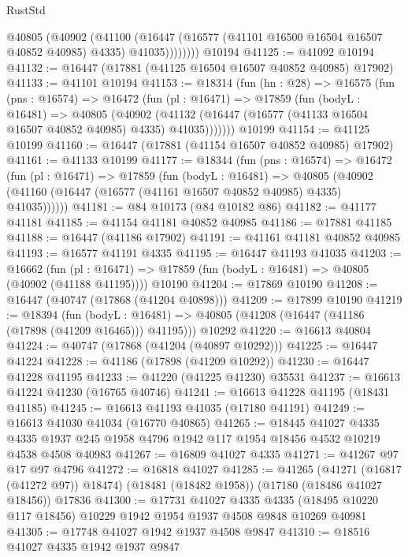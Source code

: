 \begin{lexlean}{RustStd}
\begin{coremodule}
            @40805
              (@40902
                (@41100
                  (@16447 (@16577 (@41101 @16500 @16504 @16507 @40852 @40985) @4335) @41035))))))))
    @10194
@41125 := @41092 @10194
@41132 := @16447 (@17881 (@41125 @16504 @16507 @40852 @40985) @17902)
@41133 := @41101 @10194
@41153 := @18314
    (fun (hn : @28) =>
    @16575
      (fun (pns : @16574) =>
      @16472
        (fun (pl : @16471) =>
        @17859
          (fun (bodyL : @16481) =>
          @40805
            (@40902
              (@41132 (@16447 (@16577 (@41133 @16504 @16507 @40852 @40985) @4335) @41035)))))))
    @10199
@41154 := @41125 @10199
@41160 := @16447 (@17881 (@41154 @16507 @40852 @40985) @17902)
@41161 := @41133 @10199
@41177 := @18344
    (fun (pns : @16574) =>
    @16472
      (fun (pl : @16471) =>
      @17859
        (fun (bodyL : @16481) =>
        @40805 (@40902 (@41160 (@16447 (@16577 (@41161 @16507 @40852 @40985) @4335) @41035))))))
@41181 := @84 @10173 (@84 @10182 @86)
@41182 := @41177 @41181
@41185 := @41154 @41181 @40852 @40985
@41186 := @17881 @41185
@41188 := @16447 (@41186 @17902)
@41191 := @41161 @41181 @40852 @40985
@41193 := @16577 @41191 @4335
@41195 := @16447 @41193 @41035
@41203 := @16662
    (fun (pl : @16471) => @17859 (fun (bodyL : @16481) => @40805 (@40902 (@41188 @41195))))
    @10190
@41204 := @17869 @10190
@41208 := @16447 (@40747 (@17868 (@41204 @40898)))
@41209 := @17899 @10190
@41219 := @18394
    (fun (bodyL : @16481) => @40805 (@41208 (@16447 (@41186 (@17898 (@41209 @16465))) @41195)))
    @10292
@41220 := @16613 @40804
@41224 := @40747 (@17868 (@41204 (@40897 @10292)))
@41225 := @16447 @41224
@41228 := @41186 (@17898 (@41209 @10292))
@41230 := @16447 @41228 @41195
@41233 := @41220 (@41225 @41230) @35531
@41237 := @16613 @41224 @41230 (@16765 @40746)
@41241 := @16613 @41228 @41195 (@18431 @41185)
@41245 := @16613 @41193 @41035 (@17180 @41191)
@41249 := @16613 @41030 @41034 (@16770 @40865)
@41265 := @18445
    @41027
    @4335
    @4335
    @1937
    @245
    @1958
    @4796
    @1942
    @117
    @1954
    @18456
    @4532
    @10219
    @4538
    @4508
    @40983
@41267 := @16809 @41027 @4335
@41271 := @41267 @97 @17 @97 @4796
@41272 := @16818 @41027
@41285 := @41265
    (@41271 (@16817 (@41272 @97)) @18474)
    (@18481 (@18482 @1958))
    (@17180 (@18486 @41027 @18456))
    @17836
@41300 := @17731
    @41027
    @4335
    @4335
    (@18495 @10220 @117 @18456)
    @10229
    @1942
    @1954
    @1937
    @4508
    @9848
    @10269
    @40981
@41305 := @17748 @41027 @1942 @1937 @4508 @9847
@41310 := @18516 @41027 @4335 @1942 @1937 @9847

\end{coremodule}
\end{lexlean}
